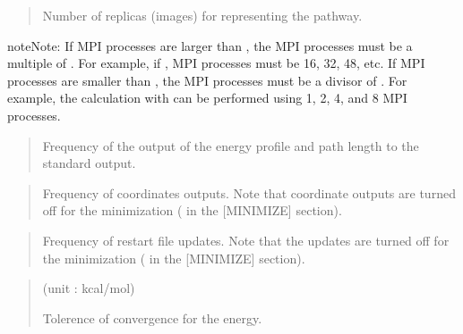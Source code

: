 \documentclass[a4paper,11pt,oneside,english]{sphinxmanual}
\begin{document}
 
\begin{quote}


Number of replicas (images) for representing the pathway.
\end{quote}

\begin{sphinxadmonition}{note}{Note:}
If MPI processes are larger than , the MPI processes must
be a multiple of . For example, if ,
MPI processes must be 16, 32, 48, etc. If MPI processes are smaller
than , the MPI processes must be a divisor of .
For example, the calculation with   can be performed
using 1, 2, 4, and 8 MPI processes.
\end{sphinxadmonition}

 
\begin{quote}


Frequency of the output of the energy profile and path length to the
standard output.
\end{quote}

 
\begin{quote}


Frequency of coordinates outputs. Note that coordinate outputs are turned
off for the minimization ( in the {[}MINIMIZE{]} section).
\end{quote}

 
\begin{quote}


Frequency of restart file updates. Note that the updates are turned
off for the minimization ( in the {[}MINIMIZE{]} section).
\end{quote}

 
\begin{quote}

 (unit : kcal/mol)

Tolerence of convergence for the energy.
\end{quote}
\end{document}
